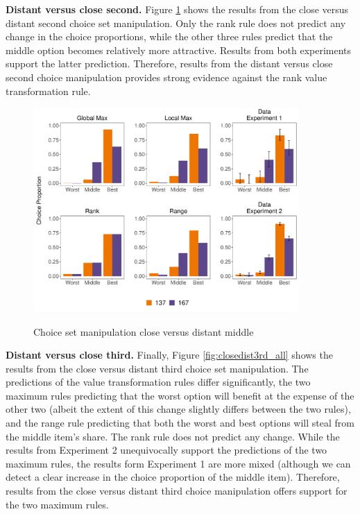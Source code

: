 \documentclass[11pt,a4paper]{article}
\begin{document}
\textbf{Distant versus close second.} Figure \ref{fig:distclose2nd_all} shows the results from the close versus distant second choice set manipulation. Only the rank rule does not predict any change in the choice proportions, while the other three rules predict that the middle option becomes relatively more attractive. Results from both experiments support the latter prediction. Therefore, results from the distant versus close second choice manipulation provides strong evidence against the rank value transformation rule. 


\begin{figure}[!htb]
\captionsetup{justification=centering}
\centering
\caption{Choice set manipulation close versus distant middle}
\includegraphics[width=0.9\textwidth]{./closedistsec.pdf}
\label{fig:distclose2nd_all}
\end{figure}

\textbf{Distant versus close third.} Finally, Figure \ref{fig:closedist3rd_all} shows the results from the close versus distant third choice set manipulation. The predictions of the value transformation rules differ significantly, the two maximum rules predicting that the worst option will benefit at the expense of the other two (albeit the extent of this change slightly differs between the two rules), and the range rule predicting that both the worst and best options will steal from the middle item's share. The rank rule does not predict any change.  While the results from Experiment 2 unequivocally support the predictions of the two maximum rules, the results form Experiment 1 are more mixed (although we can detect a clear increase in the choice proportion of the  middle item). Therefore, results from the close versus distant third choice manipulation offers support for the two maximum rules.
\end{document}
